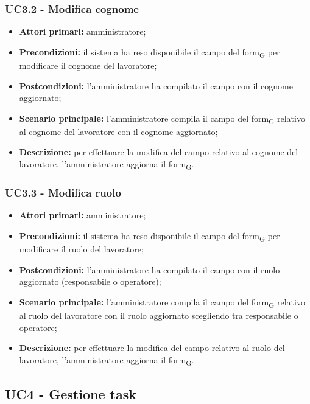 \subsubsection{UC3.2 - Modifica cognome}

\begin{itemize}
	\item 	\textbf{Attori primari:} amministratore;
	\item 	\textbf{Precondizioni:} il sistema ha reso disponibile il campo del \gls{form}\textsubscript{G} per modificare il cognome del lavoratore;
	\item 	\textbf{Postcondizioni:} l'amministratore ha compilato il campo con il cognome aggiornato;
	\item 	\textbf{Scenario principale:} l'amministratore compila il campo del \gls{form}\textsubscript{G} relativo al cognome del lavoratore con il cognome aggiornato;
	\item 	\textbf{Descrizione:} per effettuare la modifica del campo relativo al cognome del lavoratore, l'amministratore aggiorna il \gls{form}\textsubscript{G}.

\end{itemize}
\subsubsection{UC3.3 - Modifica ruolo}

\begin{itemize}
	\item 	\textbf{Attori primari:} amministratore;
	\item 	\textbf{Precondizioni:} il sistema ha reso disponibile il campo del \gls{form}\textsubscript{G} per modificare il ruolo del lavoratore;
	\item 	\textbf{Postcondizioni:} l'amministratore ha compilato il campo con il ruolo aggiornato (responsabile o operatore);
	\item 	\textbf{Scenario principale:} l'amministratore compila il campo del \gls{form}\textsubscript{G} relativo al ruolo del lavoratore con il ruolo aggiornato scegliendo tra responsabile o operatore;
	\item 	\textbf{Descrizione:} per effettuare la modifica del campo relativo al ruolo del lavoratore, l'amministratore aggiorna il \gls{form}\textsubscript{G}.

\end{itemize}
\subsection{UC4 - Gestione task}

